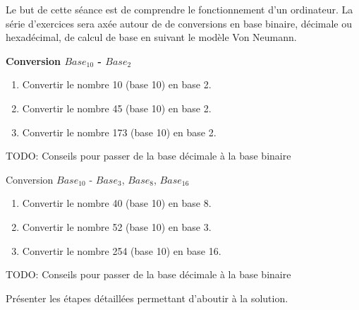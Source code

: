 



\ShowSolutiontrue
\ShowConseiltrue
\titre
{}

Le but de cette séance est de comprendre le fonctionnement d'un ordinateur. La série d'exercices sera axée autour de de conversions en base binaire, décimale ou hexadécimal, de calcul de base en suivant le modèle Von Neumann. \\


\begin{Exercice}[5 minutes]  \textbf{Conversion $Base_{10}$ - $Base_2$}\\
    \begin{enumerate}
        \item Convertir le nombre 10 (base 10) en base 2.
        \item Convertir le nombre 45 (base 10) en base 2.
        \item Convertir le nombre 173 (base 10) en base 2.
    \end{enumerate}

    \begin{conseil}
        TODO: Conseils pour passer de la base décimale à la base binaire
    \end{conseil}
\end{Exercice}


\begin{Exercice}[5 minutes]  Conversion $Base_{10}$ - $Base_3$, $Base_8$, $Base_{16}$\\
    \begin{enumerate}
        \item Convertir le nombre 40 (base 10) en base 8.
        \item Convertir le nombre 52 (base 10) en base 3.
        \item Convertir le nombre 254 (base 10) en base 16.
    \end{enumerate}

    \begin{conseil}
        TODO: Conseils pour passer de la base décimale à la base binaire
    \end{conseil}
    \begin{solution}
        Présenter les étapes détaillées permettant d'aboutir à la solution.
    \end{solution}
\end{Exercice}

